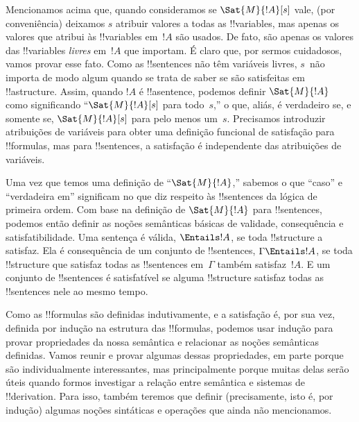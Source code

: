 \documentclass[../../../include/open-logic-section]{subfiles}
\begin{document}


Mencionamos acima que, quando consideramos se $\Sat{M}{!A}[s]$ vale,
(por conveniência) deixamos $s$ atribuir valores a todas as
!!{variable}s, mas apenas os valores que atribui às !!{variable}s
em~$!A$ são usados.  De fato, são apenas os valores das
!!{variable}s \emph{livres} em~$!A$ que importam. É claro que, por
sermos cuidadosos, vamos provar esse fato. Como as !!{sentence}s não têm
variáveis livres, $s$~não importa de modo algum quando se trata de
saber se são satisfeitas em !!a{structure}.  Assim, quando $!A$ é
!!a{sentence}, podemos definir $\Sat{M}{!A}$ como significando
``$\Sat{M}{!A}[s]$ para todo~$s$,'' o que, aliás, é verdadeiro se, e
somente se, $\Sat{M}{!A}[s]$ para pelo menos um~$s$. Precisamos
introduzir atribuições de variáveis para obter uma definição funcional
de satisfação para !!{formula}s, mas para !!{sentence}s, a satisfação é
independente das atribuições de variáveis.

Uma vez que temos uma definição de ``$\Sat{M}{!A}$,'' sabemos o que
``caso'' e ``verdadeira em'' significam no que diz respeito às
!!{sentence}s da lógica de primeira ordem. Com base na definição de
$\Sat{M}{!A}$ para !!{sentence}s, podemos então definir as noções
semânticas básicas de validade, consequência e satisfatibilidade.  Uma
sentença é válida, $\Entails !A$, se toda !!{structure} a satisfaz. Ela
é consequência de um conjunto de !!{sentence}s, $\Gamma \Entails !A$,
se toda !!{structure} que satisfaz todas as !!{sentence}s em~$\Gamma$
também satisfaz~$!A$. E um conjunto de !!{sentence}s é satisfatível se
alguma !!{structure} satisfaz todas as !!{sentence}s nele ao mesmo
tempo.

Como as !!{formula}s são definidas indutivamente, e a satisfação é, por
sua vez, definida por indução na estrutura das !!{formula}s, podemos
usar indução para provar propriedades da nossa semântica e relacionar as
noções semânticas definidas.  Vamos reunir e provar algumas dessas
propriedades, em parte porque são individualmente interessantes, mas
principalmente porque muitas delas serão úteis quando formos investigar
a relação entre semântica e sistemas de !!{derivation}. Para isso,
também teremos que definir (precisamente, isto é, por indução) algumas
noções sintáticas e operações que ainda não mencionamos.
\end{document}
